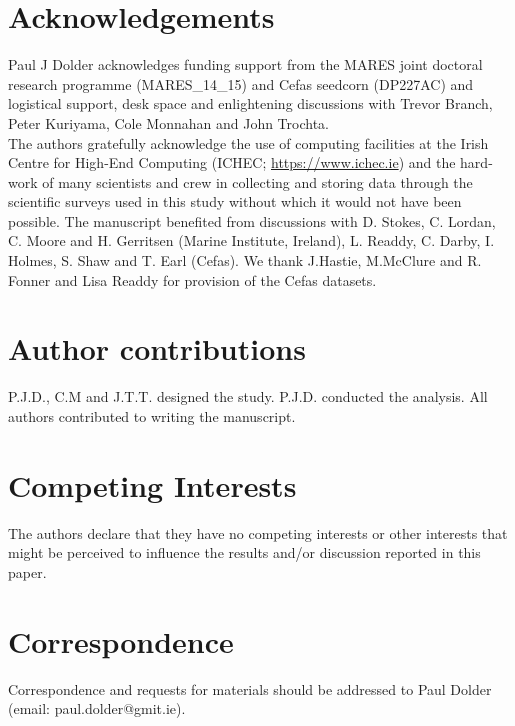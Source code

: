 \documentclass[fleqn,10pt]{wlscirep}
\begin{document}

\newpage



\section*{Acknowledgements} 
Paul J Dolder acknowledges funding support from the MARES joint doctoral
research programme (MARES\_14\_15) and Cefas seedcorn (DP227AC) and logistical
support, desk space and enlightening discussions with Trevor Branch, Peter
Kuriyama, Cole Monnahan and John Trochta.\\
	 
The authors gratefully acknowledge the use of computing facilities at the Irish
Centre for High-End Computing (ICHEC; \url{https://www.ichec.ie}) and the
hard-work of many scientists and crew in collecting and storing data through
the scientific surveys used in this study without which it would not have been
possible. The manuscript benefited from discussions with D. Stokes, C.  Lordan,
C. Moore and H. Gerritsen (Marine Institute, Ireland), L.  Readdy, C.  Darby,
I. Holmes, S. Shaw and T. Earl (Cefas). We thank J.Hastie, M.McClure and R.
Fonner and Lisa Readdy for provision of the Cefas datasets.

\section*{Author contributions}
P.J.D., C.M and J.T.T. designed the study. P.J.D. conducted the analysis. All
authors contributed to writing the manuscript.  

\section*{Competing Interests}
The authors declare that they have no competing interests or other interests
that might be perceived to influence the results and/or discussion reported in
this paper.

\section*{Correspondence}
Correspondence and requests for materials should be addressed to Paul Dolder
(email: paul.dolder@gmit.ie).
\end{document}
